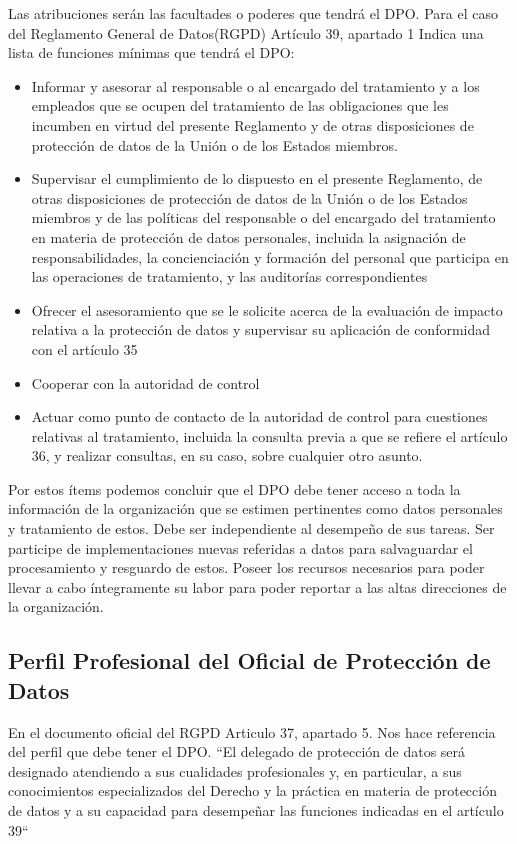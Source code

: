 \documentclass[stu, 11pt, letterpaper, donotrepeattitle, floatsintext, natbib]{apa7}
\begin{document}
Las atribuciones serán las facultades o poderes que tendrá el DPO. Para el caso del Reglamento General de Datos(RGPD)\citep[pg.~L 119/56]{rgpd} Artículo 39, apartado 1 Indica una lista de funciones mínimas que tendrá el DPO:
\begin{itemize}
\item Informar y asesorar al responsable o al encargado del tratamiento y a los empleados que se ocupen del tratamiento
de las obligaciones que les incumben en virtud del presente Reglamento y de otras disposiciones de protección de datos de la Unión o de los Estados miembros.
\item Supervisar el cumplimiento de lo dispuesto en el presente Reglamento, de otras disposiciones de protección de datos
de la Unión o de los Estados miembros y de las políticas del responsable o del encargado del tratamiento en materia
de protección de datos personales, incluida la asignación de responsabilidades, la concienciación y formación del
personal que participa en las operaciones de tratamiento, y las auditorías correspondientes
\item Ofrecer el asesoramiento que se le solicite acerca de la evaluación de impacto relativa a la protección de datos y
supervisar su aplicación de conformidad con el artículo 35
\item Cooperar con la autoridad de control
\item Actuar como punto de contacto de la autoridad de control para cuestiones relativas al tratamiento, incluida la consulta previa a que se refiere el artículo 36, y realizar consultas, en su caso, sobre cualquier otro asunto.
\end{itemize}

Por estos ítems podemos concluir que el DPO debe tener acceso a toda la información de la organización que se estimen pertinentes como datos personales y tratamiento de estos. Debe ser independiente al desempeño de sus tareas. Ser participe de implementaciones nuevas referidas a datos para salvaguardar el procesamiento y resguardo de estos. Poseer los recursos necesarios para poder llevar a cabo íntegramente su labor para poder reportar a las altas direcciones de la organización.

\subsection{Perfil Profesional del Oficial de Protección de Datos}

En el documento oficial del RGPD Articulo 37, apartado 5. Nos hace referencia del perfil que debe tener el DPO. ``El delegado de protección de datos será designado atendiendo a sus cualidades profesionales y, en particular, a sus conocimientos especializados del Derecho y la práctica en materia de protección de datos y a su capacidad para desempeñar las funciones indicadas en el artículo 39`` \citep[pg.~L 119/55]{rgpd}
\end{document}
